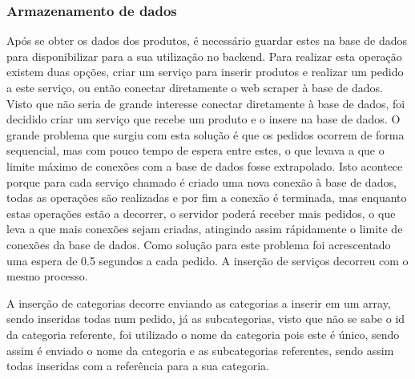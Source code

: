 \subsubsection{Armazenamento de dados}

Após se obter os dados dos produtos, é necessário guardar estes na base de dados para disponibilizar para a sua utilização no backend. Para realizar
esta operação existem duas opções, criar um serviço para inserir produtos e realizar um pedido a este serviço, ou então conectar diretamente
o web scraper à base de dados. Visto que não seria de grande interesse conectar diretamente à base de dados, foi decidido criar um serviço que recebe um produto e o 
insere na base de dados. O grande problema que surgiu com esta solução é que os pedidos ocorrem de forma sequencial, mas com pouco tempo de espera entre estes, o que
levava a que o limite máximo de conexões com a base de dados fosse extrapolado. Isto acontece porque para cada serviço chamado é criado uma nova conexão à base de 
dados, todas as operações são realizadas e por fim a conexão é terminada, mas enquanto estas operações estão a decorrer, o servidor poderá receber mais pedidos, o que 
leva a que mais conexões sejam criadas, atingindo assim rápidamente o limite de conexões da base de dados. Como solução para este problema foi acrescentado uma espera 
de 0.5 segundos a cada pedido. A inserção de serviços decorreu com o mesmo processo.

A inserção de categorias decorre enviando as categorias a inserir em um array, sendo inseridas todas num pedido, já as subcategorias, visto que não se sabe o id da 
categoria referente, foi utilizado o nome da categoria pois este é único, sendo assim é enviado o nome da categoria e as subcategorias referentes, sendo assim todas inseridas
com a referência para a sua categoria.
